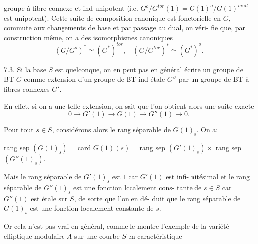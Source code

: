 
groupe à fibre connexe et ind-unipotent (i.e. $G^{o}/G^{tor}(1) = G(1)^{o}/G(1)^{mult}$
est unipotent). Cette suite de composition canonique est fonctorielle
en $G$, commute aux changements de base et par passage au dual, on véri-%
fie que, par construction même, on a des isomorphismes canoniques
\[ (G/G^{o})^{*} \simeq (G^{*})^{tor} , \quad (G/G^{tor})^{*} \simeq (G^{*})^{o} . \]

7.3. Si la base $S$ est quelconque, on en peut pas en général écrire
un groupe de BT $G$ comme extension d'un groupe de BT ind-étale $G''$
par un groupe de BT à fibres connexes $G'$.

En effet, si on a une telle extension, on sait que l'on obtient
alors une suite exacte
\[ 0 \to G'(1) \to G(1) \to G''(1) \to 0 . \]

Pour tout $s \in S$, considérons alors le rang séparable de
$G(1)_{s}$. On a:

rang sep $(G(1)_{s})$ = card $G(1)(\overline{s})$ = rang sep $(G'(1)_{s}) \times$ rang sep $(G''(1)_{s})$.

Mais le rang séparable de $G'(1)_{s}$ est $1$ car $G'(1)$ est infi-%
nitésimal et le rang séparable de $G''(1)_{s}$ est une fonction localement cons-%
tante de $s \in S$ car $G''(1)$ est étale sur $S$, de sorte que l'on en dé-%
duit que le rang séparable de $G(1)_{s}$ est une fonction localement constante
de $s$.

Or cela n'est pas vrai en général, comme le montre l'exemple de
la variété elliptique modulaire $A$ sur une courbe $S$ en caractéristique

